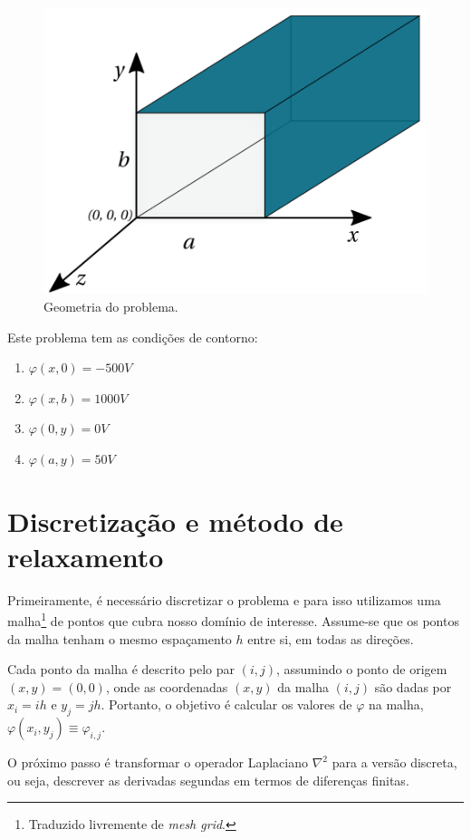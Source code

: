 \documentclass[a4paper,12pt]{article}
\begin{document}
\begin{figure}[H]
\centering
\includegraphics[scale=0.5]{img/box}
  \caption{Geometria do problema.}
\end{figure}

Este problema tem as condições de contorno:
\begin{enumerate}
  \item $\varphi(x,0)=-500V$
  \item $\varphi(x,b)=1000V$
  \item $\varphi(0,y)=0V$
  \item $\varphi(a, y) = 50V$
\end{enumerate}

\section{Discretização e método de relaxamento}

Primeiramente, é necessário discretizar o problema e para isso utilizamos
uma malha\footnote{Traduzido livremente de \textit{mesh grid}.} de pontos que cubra nosso domínio de interesse. Assume-se que
os pontos da malha tenham o mesmo espaçamento $h$ entre si, em todas as
direções.

Cada ponto da malha é descrito pelo par $(i, j)$, assumindo o ponto de
origem $(x, y) = (0, 0)$, onde as coordenadas $(x, y)$ da malha $(i, j)$
são dadas por $x_i=ih$ e $y_j=jh$. Portanto, o objetivo é calcular os valores de $\varphi$ na malha, $\varphi(x_i, y_j) \equiv \varphi_{i, j}$.

O próximo passo é transformar o operador Laplaciano $\nabla^2$ para a versão discreta, ou seja, descrever as derivadas segundas em termos de diferenças finitas.
\end{document}
